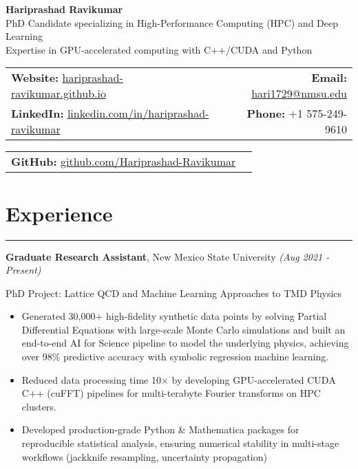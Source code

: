 \documentclass[11pt]{article}
\begin{document}
\begin{center}
  \textbf{\Huge Hariprashad Ravikumar} \\[0.6em]
  \vspace{0.5em}
  PhD Candidate specializing in High-Performance Computing (HPC) and Deep Learning \\
  Expertise in GPU-accelerated computing with C++/CUDA and Python \\
\end{center}

\begin{tabularx}{\textwidth}{@{}Xr@{}}
    \textbf{Website:} \href{https://hariprashad-ravikumar.github.io}{hariprashad-ravikumar.github.io} & \textbf{Email:} \href{mailto:hari1729@nmsu.edu}{hari1729@nmsu.edu}  \\
    \textbf{LinkedIn:} \href{https://www.linkedin.com/in/hariprashad-ravikumar}{linkedin.com/in/hariprashad-ravikumar} & \textbf{Phone:} +1 575-249-9610 
\end{tabularx}
\vspace{-1em}
\begin{tabularx}{\textwidth}{@{}Xr@{}}
\textbf{GitHub:} \href{https://github.com/Hariprashad-Ravikumar}{github.com/Hariprashad-Ravikumar}  \\
\end{tabularx}


\section*{Experience}
\hrule
\vspace{-0.3em}
\textbf{Graduate Research Assistant}, New Mexico State University \hfill \textit{(Aug 2021 - Present)}
\vspace{-0.2em}

PhD Project: Lattice QCD and Machine Learning Approaches to TMD Physics
\vspace{-0.5em}
\begin{itemize}
\item Generated 30,000+ high-fidelity synthetic data points by solving Partial Differential Equations with large-scale Monte Carlo simulations and built an end-to-end AI for Science pipeline to model the underlying physics, achieving over 98\% predictive accuracy with symbolic regression machine learning.
\vspace{-0.5em}
\item Reduced data processing time 10× by developing GPU-accelerated CUDA C++ (cuFFT) pipelines for multi-terabyte Fourier transforms on HPC clusters.
\vspace{-0.5em}
\item Developed production-grade Python \& Mathematica packages for reproducible statistical analysis, ensuring numerical stability in multi-stage workflows (jackknife resampling, uncertainty propagation)
\end{itemize}
\end{document}
